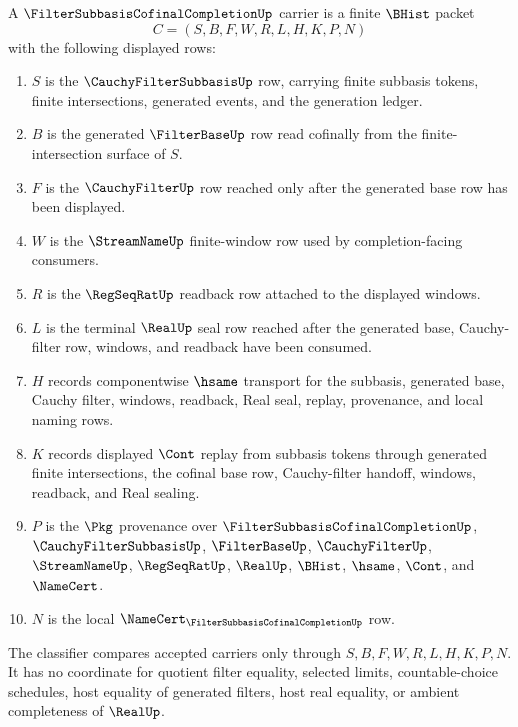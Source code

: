 \begin{definition}
\label{def:filter-subbasis-cofinal-completion-carrier}
A $\FilterSubbasisCofinalCompletionUp$ carrier is a finite $\BHist$ packet
$$
C=(S,B,F,W,R,L,H,K,P,N)
$$
with the following displayed rows:
\begin{enumerate}
\item $S$ is the $\CauchyFilterSubbasisUp$ row, carrying finite subbasis tokens, finite intersections, generated events, and the generation ledger.
\item $B$ is the generated $\FilterBaseUp$ row read cofinally from the finite-intersection surface of $S$.
\item $F$ is the $\CauchyFilterUp$ row reached only after the generated base row has been displayed.
\item $W$ is the $\StreamNameUp$ finite-window row used by completion-facing consumers.
\item $R$ is the $\RegSeqRatUp$ readback row attached to the displayed windows.
\item $L$ is the terminal $\RealUp$ seal row reached after the generated base, Cauchy-filter row, windows, and readback have been consumed.
\item $H$ records componentwise $\hsame$ transport for the subbasis, generated base, Cauchy filter, windows, readback, Real seal, replay, provenance, and local naming rows.
\item $K$ records displayed $\Cont$ replay from subbasis tokens through generated finite intersections, the cofinal base row, Cauchy-filter handoff, windows, readback, and Real sealing.
\item $P$ is the $\Pkg$ provenance over $\FilterSubbasisCofinalCompletionUp$, $\CauchyFilterSubbasisUp$, $\FilterBaseUp$, $\CauchyFilterUp$, $\StreamNameUp$, $\RegSeqRatUp$, $\RealUp$, $\BHist$, $\hsame$, $\Cont$, and $\NameCert$.
\item $N$ is the local $\NameCert_{\FilterSubbasisCofinalCompletionUp}$ row.
\end{enumerate}
The classifier compares accepted carriers only through $S,B,F,W,R,L,H,K,P,N$. It has no coordinate for quotient filter equality, selected limits, countable-choice schedules, host equality of generated filters, host real equality, or ambient completeness of $\RealUp$.
\end{definition}

